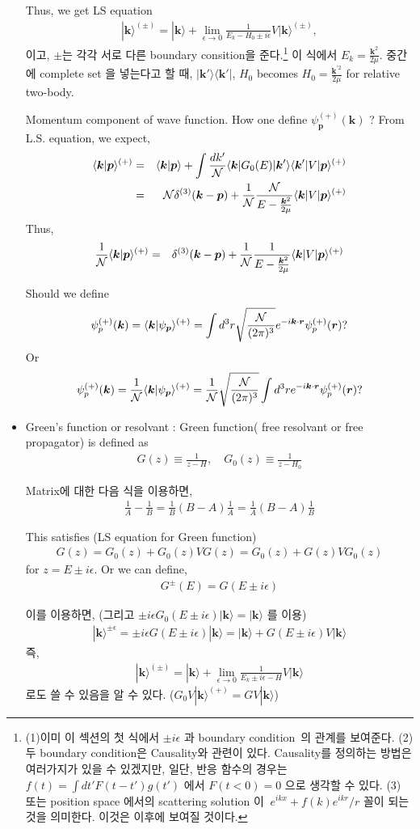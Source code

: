 \documentclass[10pt]{book}
\def\bm{\boldsymbol}
\newcommand{\bea}{\begin{eqnarray}}
\newcommand{\eea}{\end{eqnarray}}
\newcommand{\no}{\nonumber \\}
\def\vp{{\bm p}}
\def\vk{{\bm k}}
\def\vr{{\bm r}}
\def\la{\langle}
\def\ra{\rangle}
\begin{document}
\begin{itemize}
 Thus, we get LS equation 
\bea
\boxed{
|\vk\ra^{(\pm)}=|\vk\ra+\lim_{\epsilon\to 0}\frac{1}{E_k-H_0\pm i\epsilon}V|\vk\ra^{(\pm)},}
\eea
이고, $\pm$는 각각 서로 다른 boundary consition을 준다.\footnote{
(1)이미 이 섹션의 첫 식에서 $\pm i \epsilon$ 과 boundary condition 의 관계를 보여준다. 
(2)  	
두 boundary condition은 Causality와 관련이 있다. Causality를 정의하는 방법은
여러가지가 있을 수 있겠지만, 일단, 반응 함수의 경우는 $f(t)=\int dt' F(t-t')g(t')$
에서 $F(t<0)=0$ 으로 생각할 수 있다. 
(3) 또는 position space 에서의 scattering solution 이 
$~e^{ikx}+f(k) e^{ikr}/r$ 꼴이 되는 것을 의미한다.  이것은 이후에 보여질 것이다.  
} 
이 식에서  $E_k=\frac{\vk^2}{2\mu}$.
중간에 complete set 을 넣는다고 할 때, $|\vk'\ra\la \vk'|$, $H_0$ becomes
$H_0=\frac{\vk^{'2}}{2\mu}$ for relative two-body. 

{\color{blue} Momentum component of wave function. How one define $\psi_{\vp}^{(+)}(\vk)$ ?
From L.S. equation, we expect,
\bea 
\la \vk|\vp\ra^{(+)}&=&\la \vk|\vp\ra+\int \frac{dk'}{{\cal N}} \la \vk|G_0(E)|\vk'\ra \la \vk'|V|\vp\ra^{(+)}
                   \no 
                   &=&{\cal N}\delta^{(3)}(\vk-\vp)+\frac{1}{\cal N}\frac{{\cal N} }{E-\frac{\vk^2}{2\mu}}
                   \la \vk|V|\vp\ra^{(+)}
\eea 
Thus,
\bea 
\frac{1}{\cal N} \la \vk|\vp\ra^{(+)}&=&\delta^{(3)}(\vk-\vp)+\frac{1}{\cal N}\frac{1 }{E-\frac{\vk^2}{2\mu}}
\la \vk|V|\vp\ra^{(+)}
\eea 


Should we define
\bea 
\psi_p^{(+)}(\vk)=\la \vk|\psi_\vp\ra^{(+)}=\int d^3 r \sqrt{\frac{\cal{N}}{(2\pi)^3}   }e^{-i\vk\cdot\vr}\psi^{(+)}_p(\vr) ?
\eea 
Or 
\bea 
\psi_p^{(+)}(\vk)=\frac{1}{\cal N} \la \vk|\psi_\vp\ra^{(+)}= 
  \frac{1}{\cal N}\sqrt{\frac{\cal{N}}{(2\pi)^3}} \int d^3 r e^{-i\vk\cdot\vr}\psi^{(+)}_p(\vr) ?
\eea 
}	
	
	
\item Green's function or resolvant : Green function( free resolvant or free propagator) is defined as
\bea
G(z)\equiv\frac{1}{z-H},\quad
G_0(z)\equiv\frac{1}{z-H_0}
\eea

Matrix에 대한 다음 식을 이용하면, 
\bea
\boxed{ \frac{1}{A}-\frac{1}{B}=\frac{1}{B}(B-A)\frac{1}{A} =\frac{1}{A}(B-A)\frac{1}{B} }
\eea 

This satisfies (LS equation for Green function) 
\bea
G(z)=G_0(z)+G_0(z)VG(z)=G_0(z)+G(z)VG_0(z)
\eea
for $z=E\pm i\epsilon$. Or we can define,
\bea
G^{\pm}(E)=G(E\pm i\epsilon)
\eea

이를 이용하면, (그리고 $\pm i\epsilon G_0(E\pm i\epsilon)|\vk\ra=|\vk\ra$ 를 이용)
\bea 
|\vk\ra^{\pm\epsilon} =\pm i\epsilon G(E\pm i\epsilon)|\vk\ra 
   =|\vk\ra+ G(E\pm i\epsilon)V|\vk\ra  
\eea 
즉,
\bea 
\boxed{ 
|\vk\ra^{(\pm)}=|\vk\ra+ \lim_{\epsilon\to 0} \frac{1}{E_k\pm i\epsilon-H} V|\vk\ra}
\eea 
로도 쓸 수 있음을 알 수 있다. ($G_0V|\vk\ra^{(+)}=GV|\vk\ra $)


\end{itemize}
\end{document}
